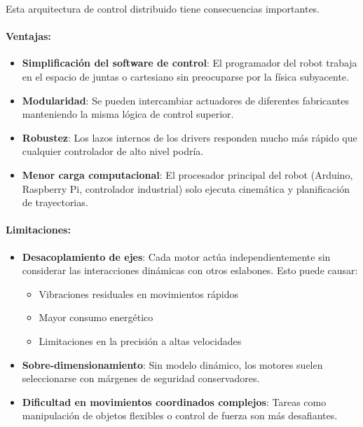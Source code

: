 Esta arquitectura de control distribuido tiene consecuencias importantes.

\paragraph{Ventajas:}

\begin{itemize}
    \item \textbf{Simplificación del software de control}: El programador del robot trabaja en el espacio de juntas o cartesiano sin preocuparse por la física subyacente.
    
    \item \textbf{Modularidad}: Se pueden intercambiar actuadores de diferentes fabricantes manteniendo la misma lógica de control superior.
    
    \item \textbf{Robustez}: Los lazos internos de los drivers responden mucho más rápido que cualquier controlador de alto nivel podría.
    
    \item \textbf{Menor carga computacional}: El procesador principal del robot (Arduino, Raspberry Pi, controlador industrial) solo ejecuta cinemática y planificación de trayectorias.
\end{itemize}

\paragraph{Limitaciones:}

\begin{itemize}
    \item \textbf{Desacoplamiento de ejes}: Cada motor actúa independientemente sin considerar las interacciones dinámicas con otros eslabones. Esto puede causar:
    \begin{itemize}
        \item Vibraciones residuales en movimientos rápidos
        \item Mayor consumo energético
        \item Limitaciones en la precisión a altas velocidades
    \end{itemize}
    
    \item \textbf{Sobre-dimensionamiento}: Sin modelo dinámico, los motores suelen seleccionarse con márgenes de seguridad conservadores.
    
    \item \textbf{Dificultad en movimientos coordinados complejos}: Tareas como manipulación de objetos flexibles o control de fuerza son más desafiantes.
\end{itemize}

